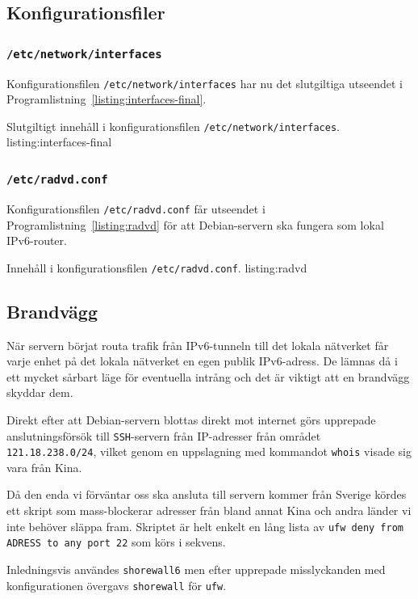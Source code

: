 \subsection{Konfigurationsfiler}
\subsubsection{\texttt{/etc/network/interfaces}}
Konfigurationsfilen \texttt{/etc/network/interfaces} har nu det slutgiltiga
utseendet i Programlistning~\ref{listing:interfaces-final}.

						 {Slutgiltigt innehåll i konfigurationsfilen
					    \texttt{/etc/network/interfaces}.}
             {listing:interfaces-final}


\subsubsection{\texttt{/etc/radvd.conf}}
Konfigurationsfilen \texttt{/etc/radvd.conf} får utseendet i
Programlistning~\ref{listing:radvd} för att Debian-servern ska fungera som
lokal IPv6-router.

						 {Innehåll i konfigurationsfilen \texttt{/etc/radvd.conf}.}
             {listing:radvd}


\subsection{Brandvägg}
När servern börjat routa trafik från IPv6-tunneln till det lokala
nätverket får varje enhet på det lokala nätverket en egen publik IPv6-adress.
De lämnas då i ett mycket sårbart läge för eventuella intrång och det
är viktigt att en brandvägg skyddar dem. 

Direkt efter att Debian-servern blottas direkt mot internet görs upprepade
anslutningsförsök till \texttt{SSH}-servern från IP-adresser från området \texttt{121.18.238.0/24}, 
vilket genom en uppslagning med kommandot \texttt{whois} visade sig vara från Kina.

Då den enda vi förväntar oss ska ansluta till servern kommer från Sverige
kördes ett skript \cite{blockchina} som mass-blockerar adresser från bland
annat Kina och andra länder vi inte behöver släppa fram. Skriptet är helt
enkelt en lång lista av \texttt{ufw deny from ADRESS to any port 22} som körs i
sekvens.

Inledningsvis användes \texttt{shorewall6} men efter upprepade misslyckanden med konfigurationen
övergavs \texttt{shorewall} för \texttt{ufw}.

